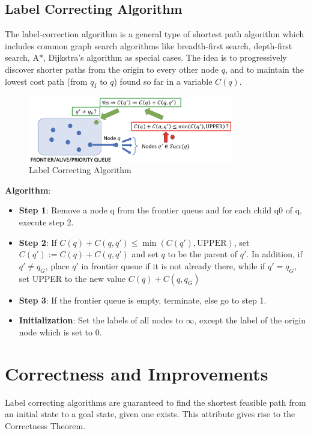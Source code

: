 \documentclass[twoside]{article}
\begin{document}
\subsection{Label Correcting Algorithm}
The label-correction algorithm is a general type of shortest path algorithm which includes common graph search algorithms like breadth-first search, depth-first search, A*, Dijkstra’s algorithm as special cases.
The idea is to progressively discover shorter paths from the origin to every other node $q$, and to maintain the lowest cost path (from $q_I$ to $q$) found so far in a variable $C(q)$.
\vspace{3em}
\begin{figure}[h]
\begin{center}
\includegraphics[width=0.8\textwidth]{fig15_10.PNG}
\caption{Label Correcting Algorithm}
\end{center}
\end{figure}
\newpage
\textbf{Algorithm}:
\vspace{-0.7em}
\begin{itemize}
    \item \textbf{Step 1}: Remove a node q from the frontier queue and for each child q0 of q, execute step 2.
    \item \textbf{Step 2}: If $ C(q) + C(q, q') \leq \min(C(q'),\textrm{UPPER})$, set $ C(q') := C(q) + C(q, q')$ and set $q$ to be the parent of $q'$. In addition, if $q' \neq q_G$, place $q'$ in frontier queue if it is not already there, while if $q' = q_G$, set UPPER to the new value $C(q) + C(q, q_G)$
    \item \textbf{Step 3}: If the frontier queue is empty, terminate, else go to step 1.
    \item \textbf{Initialization}: Set the labels of all nodes to $\infty$, except the label of the origin node which is set to 0.
\end{itemize}
\vspace{-1em}

\section{Correctness and Improvements} \label{Correctness and Improvements}
Label correcting algorithms are guaranteed to find the shortest feasible path from an initial state to a goal state, given one exists. This attribute gives rise to the Correctness Theorem. \vspace{-0.5cm}
\end{document}
